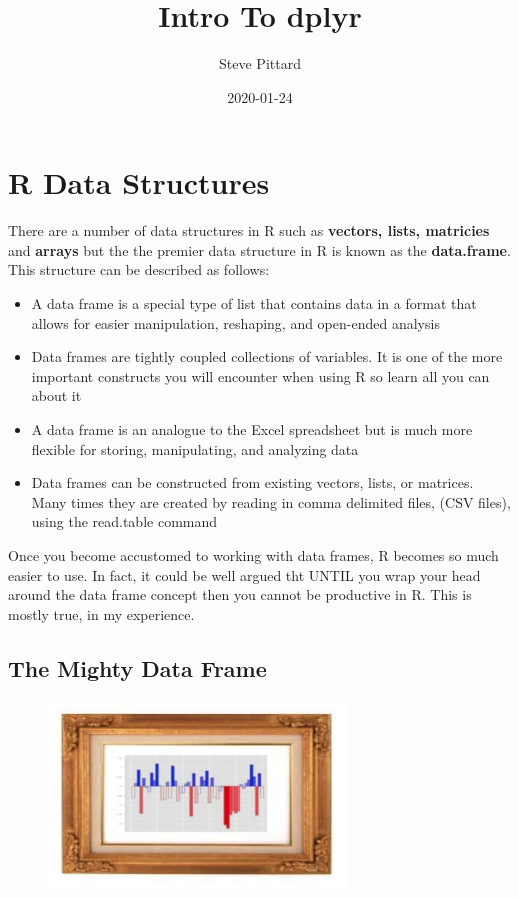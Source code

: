 \documentclass[]{book}
\title{Intro To dplyr}
\author{Steve Pittard}
\date{2020-01-24}
\begin{document}
\maketitle

{
\setcounter{tocdepth}{1}
\tableofcontents
}
\chapter{R Data Structures}\label{r-data-structures}

There are a number of data structures in R such as \textbf{vectors,
lists, matricies} and \textbf{arrays} but the the premier data structure
in R is known as the \textbf{data.frame}. This structure can be
described as follows:

\begin{itemize}
\item
  A data frame is a special type of list that contains data in a format
  that allows for easier manipulation, reshaping, and open-ended
  analysis
\item
  Data frames are tightly coupled collections of variables. It is one of
  the more important constructs you will encounter when using R so learn
  all you can about it
\item
  A data frame is an analogue to the Excel spreadsheet but is much more
  flexible for storing, manipulating, and analyzing data
\item
  Data frames can be constructed from existing vectors, lists, or
  matrices. Many times they are created by reading in comma delimited
  files, (CSV files), using the read.table command
\end{itemize}

Once you become accustomed to working with data frames, R becomes so
much easier to use. In fact, it could be well argued tht UNTIL you wrap
your head around the data frame concept then you cannot be productive in
R. This is mostly true, in my experience.

\section{The Mighty Data Frame}\label{the-mighty-data-frame}

\begin{figure}
\centering
\includegraphics[width=3.12500in]{./figures/dframe.png}
\caption{}
\end{figure}
\end{document}
